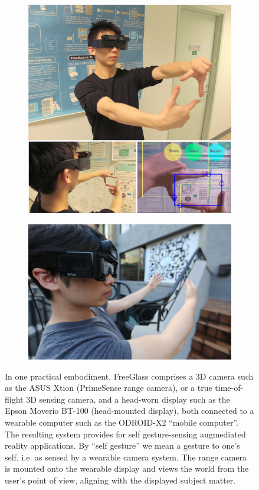 \begin{figure}
\begin{subfigure}[b]{\columnwidth}
\centering
\includegraphics[width=0.6\columnwidth]{ch5/figs/crop_sample.jpg}
\end{subfigure}
\begin{subfigure}[b]{\columnwidth}
\centering
\vspace{.032in}
\includegraphics[width=0.6\columnwidth]{ch5/figs/wearable/low_res/qr_eyeglass_IMG_2092.jpg}
\end{subfigure}
\caption{In one practical embodiment, FreeGlass comprises a 3D camera such
as the ASUS Xtion (PrimeSense
range camera), or a true time-of-flight 3D sensing camera,
and a head-worn display such as the Epson Moverio BT-100 (head-mounted display),
both connected to a wearable computer such as the
ODROID-X2 ``mobile computer''.
The resulting system provides for self gesture-sensing
augmediated reality applications.
By ``self gesture'' we mean a gesture to one's self, i.e. as sensed by
a wearable camera system.
The range camera is mounted onto the wearable display and views the world from
the user's point of view, aligning with the displayed subject matter.}
\end{figure}

